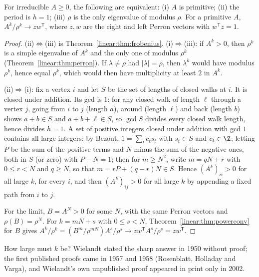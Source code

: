 \begin{theorem}\label{linear:thm:primitive}
For irreducible $A\ge0$, the following are equivalent: (i) $A$ is primitive; (ii) the period is $h=1$; (iii) $\rho$ is the
only eigenvalue of modulus $\rho$. For a primitive $A$, $A^k/\rho^k\to zw^{\mathsf T}$, where $z,w$ are the right and left Perron
vectors with $w^{\mathsf T}z=1$.
\end{theorem}
\begin{proof}
(ii)$\Leftrightarrow$(iii) is Theorem~\ref{linear:thm:frobenius}. (i)$\Rightarrow$(iii): if $A^k>0$, then $\rho^k$ is a simple eigenvalue
of $A^k$ and the only one of modulus $\rho^k$ (Theorem~\ref{linear:thm:perron}). If $\lambda\ne\rho$ had $|\lambda|=\rho$, then $\lambda^k$
would have modulus $\rho^k$, hence equal $\rho^k$, which would then have multiplicity at least $2$ in $A^k$.

(ii)$\Rightarrow$(i): fix a vertex $i$ and let $S$ be the set of lengths of closed walks at $i$. It is closed under addition. Its
gcd is $1$: for any closed walk of length $\ell$ through a vertex $j$, going from $i$ to $j$ (length $a$), around (length $\ell$)
and back (length $b$) shows $a+b\in S$ and $a+b+\ell\in S$, so $\gcd S$ divides every closed walk length, hence divides $h=1$.
A set of positive integers closed under addition with gcd $1$ contains all large integers: by Bezout, $1=\sum_tc_ts_t$ with
$s_t\in S$ and $c_t\in\Z$; letting $P$ be the sum of the positive terms and $N$ minus the sum of the negative ones, both in $S$
(or zero) with $P-N=1$; then for $m\ge N^2$, write $m=qN+r$ with $0\le r<N$ and $q\ge N$, so that $m=rP+(q-r)N\in S$. Hence
$(A^k)_{ii}>0$ for all large $k$, for every $i$, and then $(A^k)_{ij}>0$ for all large $k$ by appending a fixed path from $i$ to $j$.

For the limit, $B=A^N>0$ for some $N$, with the same Perron vectors and $\rho(B)=\rho^N$. For $k=mN+s$ with $0\le s<N$,
Theorem~\ref{linear:thm:powerconv} for $B$ gives $A^k/\rho^k=(B^m/\rho^{mN})A^s/\rho^s\to zw^{\mathsf T}A^s/\rho^s=zw^{\mathsf T}$.
\end{proof}

How large must $k$ be? Wielandt stated the sharp answer in 1950 without proof; the first published proofs came in 1957
and 1958 (Rosenblatt, Holladay and Varga), and Wielandt's own unpublished proof appeared in print only in 2002.

